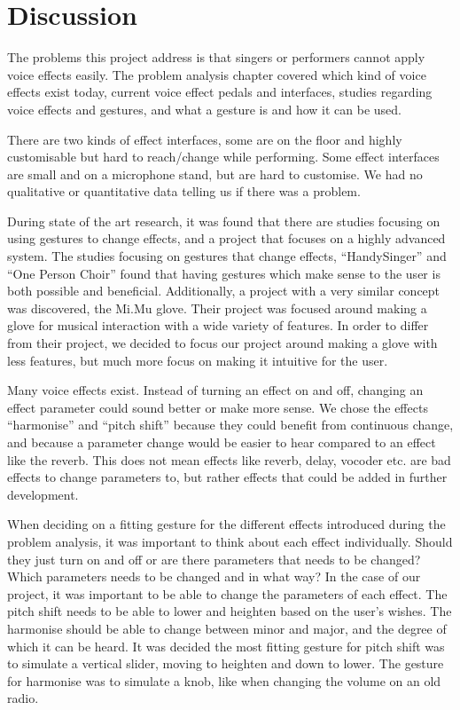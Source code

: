 \chapter{Discussion}

The problems this project address is that singers or performers cannot apply voice effects easily. The problem analysis chapter covered which kind of voice effects exist today, current voice effect pedals and interfaces, studies regarding voice effects and gestures, and what a gesture is and how it can be used.

There are two kinds of effect interfaces, some are on the floor and highly customisable but hard to reach/change while performing. Some effect interfaces are small and on a microphone stand, but are hard to customise. 
We had no qualitative or quantitative data telling us if there was a problem.

During state of the art research, it was found that there are studies focusing on using gestures to change effects, and a project that focuses on a highly advanced system. 
The studies focusing on gestures that change effects, “HandySinger” and “One Person Choir” found that having gestures which make sense to the user is both possible and beneficial. Additionally, a project with a very similar concept was discovered, the Mi.Mu glove. Their project was focused around making a glove for musical interaction with a wide variety of features. In order to differ from their project, we decided to focus our project around making a glove with less features, but much more focus on making it intuitive for the user.

Many voice effects exist. Instead of turning an effect on and off, changing an effect parameter could sound better or make more sense. We chose the effects “harmonise” and “pitch shift” because they could benefit from continuous change, and because a parameter change would be easier to hear compared to an effect like the reverb. This does not mean effects like reverb, delay, vocoder etc. are bad effects to change parameters to, but rather effects that could be added in further development.

When deciding on a fitting gesture for the different effects introduced during the problem analysis, it was important to think about each effect individually. Should they just turn on and off or are there parameters that needs to be changed? Which parameters needs to be changed and in what way?
In the case of our project, it was important to be able to change the parameters of each effect. The pitch shift needs to be able to lower and heighten based on the user's wishes. The harmonise should be able to change between minor and major, and the degree of which it can be heard. It was decided the most fitting gesture for pitch shift was to simulate a vertical slider, moving to heighten and down to lower. The gesture for harmonise was to simulate a knob, like when changing the volume on an old radio.

